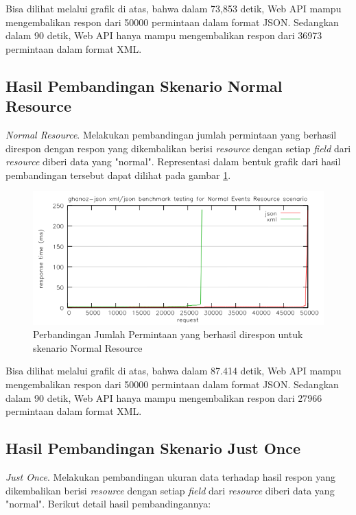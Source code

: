 \documentclass{llncs}
\begin{document}
Bisa dilihat melalui grafik di atas, bahwa dalam 73,853 detik, Web API mampu mengembalikan respon dari 50000 permintaan dalam format JSON. Sedangkan dalam 90 detik, Web API hanya mampu mengembalikan respon dari 36973 permintaan dalam format XML.

\subsection{Hasil Pembandingan Skenario Normal Resource}

\onehalfspacing \textit{Normal Resource}. Melakukan pembandingan jumlah permintaan yang berhasil direspon dengan respon yang dikembalikan berisi \textit{resource} dengan setiap \textit{field} dari \textit{resource} diberi data yang "normal". Representasi dalam bentuk grafik dari hasil pembandingan tersebut dapat dilihat pada gambar \ref{benchmark-normal-resource}.

\begin{figure}[htp]
\centering
\includegraphics[scale=0.65]{images/benchmark-normal-resource.png}
\caption{Perbandingan Jumlah Permintaan yang berhasil direspon untuk skenario Normal Resource}
\label{benchmark-normal-resource}
\end{figure}

Bisa dilihat melalui grafik di atas, bahwa dalam 87.414 detik, Web API mampu mengembalikan respon dari 50000 permintaan dalam format JSON. Sedangkan dalam 90 detik, Web API hanya mampu mengembalikan respon dari 27966 permintaan dalam format XML.

\subsection{Hasil Pembandingan Skenario Just Once}

\onehalfspacing \textit{Just Once}. Melakukan pembandingan ukuran data terhadap hasil respon yang dikembalikan berisi \textit{resource} dengan setiap \textit{field} dari \textit{resource} diberi data yang "normal". Berikut detail hasil pembandingannya:
\end{document}
